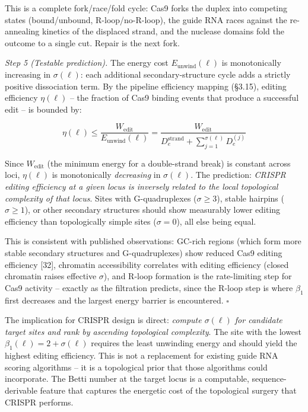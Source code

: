 \documentclass[
  11pt,
]{article}
\begin{document}
This is a complete fork/race/fold cycle: Cas9 forks the duplex into
competing states (bound/unbound, R-loop/no-R-loop), the guide RNA races
against the re-annealing kinetics of the displaced strand, and the
nuclease domains fold the outcome to a single cut. Repair is the next
fork.

\emph{Step 5 (Testable prediction).} The energy cost
\(E_{\text{unwind}}(\ell)\) is monotonically increasing in
\(\sigma(\ell)\): each additional secondary-structure cycle adds a
strictly positive dissociation term. By the pipeline efficiency mapping
(§3.15), editing efficiency \(\eta(\ell)\) -- the fraction of Cas9
binding events that produce a successful edit -- is bounded by:

\[\eta(\ell) \leq \frac{W_{\text{edit}}}{E_{\text{unwind}}(\ell)} = \frac{W_{\text{edit}}}{D_e^{\text{strand}} + \sum_{j=1}^{\sigma(\ell)} D_e^{(j)}}\]

Since \(W_{\text{edit}}\) (the minimum energy for a double-strand break)
is constant across loci, \(\eta(\ell)\) is monotonically
\emph{decreasing} in \(\sigma(\ell)\). The prediction: \emph{CRISPR
editing efficiency at a given locus is inversely related to the local
topological complexity of that locus}. Sites with G-quadruplexes
(\(\sigma \geq 3\)), stable hairpins (\(\sigma \geq 1\)), or other
secondary structures should show measurably lower editing efficiency
than topologically simple sites (\(\sigma = 0\)), all else being equal.

This is consistent with published observations: GC-rich regions (which
form more stable secondary structures and G-quadruplexes) show reduced
Cas9 editing efficiency {[}32{]}, chromatin accessibility correlates
with editing efficiency (closed chromatin raises effective \(\sigma\)),
and R-loop formation is the rate-limiting step for Cas9 activity --
exactly as the filtration predicts, since the R-loop step is where
\(\beta_1\) first decreases and the largest energy barrier is
encountered. \(\square\)

The implication for CRISPR design is direct: \emph{compute
\(\sigma(\ell)\) for candidate target sites and rank by ascending
topological complexity}. The site with the lowest
\(\beta_1(\ell) = 2 + \sigma(\ell)\) requires the least unwinding energy
and should yield the highest editing efficiency. This is not a
replacement for existing guide RNA scoring algorithms -- it is a
topological prior that those algorithms could incorporate. The Betti
number at the target locus is a computable, sequence-derivable feature
that captures the energetic cost of the topological surgery that CRISPR
performs.
\end{document}
